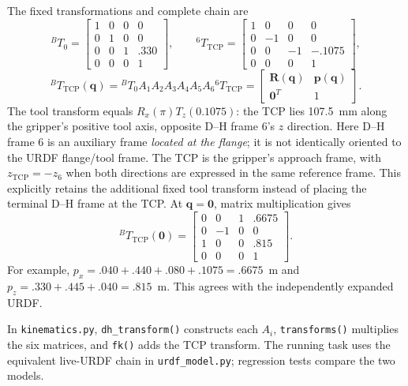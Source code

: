 \documentclass[10pt,a4paper]{article}
\newcommand{\TCP}{\mathrm{TCP}}
\newcommand{\R}{\mathbf R}
\newcommand{\p}{\mathbf p}
\newcommand{\q}{\mathbf q}
\begin{document}
The fixed transformations and complete chain are
\begin{equation}
{}^BT_0=\begin{bmatrix}1&0&0&0\\0&1&0&0\\0&0&1&.330\\0&0&0&1\end{bmatrix},\qquad
{}^6T_{\TCP}=\begin{bmatrix}1&0&0&0\\0&-1&0&0\\0&0&-1&-.1075\\0&0&0&1\end{bmatrix},
\end{equation}
\begin{equation}
\boxed{{}^BT_{\TCP}(\q)={}^BT_0A_1A_2A_3A_4A_5A_6{}^6T_{\TCP}}
=\begin{bmatrix}\R(\q)&\p(\q)\\\mathbf0^T&1\end{bmatrix}.
\end{equation}
The tool transform equals $R_x(\pi)T_z(0.1075)$: the TCP lies 107.5~mm
along the gripper's positive tool axis, opposite D--H frame 6's $z$ direction.
Here D--H frame 6 is an auxiliary frame \emph{located at the flange}; it is
not identically oriented to the URDF flange/tool frame. The TCP is the
gripper's approach frame, with $z_{\TCP}=-z_6$ when both directions are
expressed in the same reference frame. This explicitly retains the additional
fixed tool transform instead of placing the terminal D--H frame at the TCP.
At $\q=\mathbf0$, matrix multiplication gives
\begin{equation}
{}^BT_{\TCP}(\mathbf0)=
\begin{bmatrix}0&0&1&.6675\\0&-1&0&0\\1&0&0&.815\\0&0&0&1\end{bmatrix}.
\end{equation}
For example, $p_x=.040+.440+.080+.1075=.6675$~m and
$p_z=.330+.445+.040=.815$~m. This agrees with the independently expanded URDF.

In \texttt{kinematics.py}, \texttt{dh\_transform()} constructs each $A_i$,
\texttt{transforms()} multiplies the six matrices, and \texttt{fk()} adds the
TCP transform. The running task uses the equivalent live-URDF chain in
\texttt{urdf\_model.py}; regression tests compare the two models.
\end{document}
